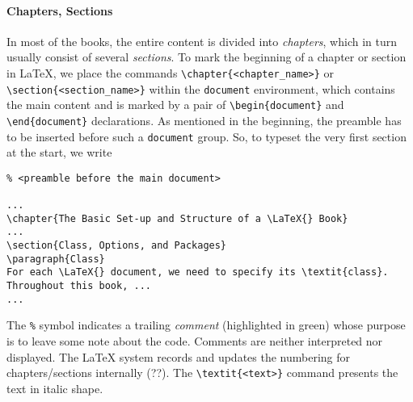 \paragraph{Chapters, Sections}
In most of the books, the entire content is divided into \textit{chapters}, which in turn usually consist of several \textit{sections}. To mark the beginning of a chapter or section in \LaTeX{}, we place the commands \texttt{\textbackslash chapter\{<chapter\_name>\}} or \texttt{\textbackslash section\{<section\_name>\}} within the \verb|document| environment, which contains the main content and is marked by a pair of \texttt{\textbackslash begin\{document\}} and \texttt{\textbackslash end\{document\}} declarations. As mentioned in the beginning, the preamble has to be inserted before such a \verb|document| group. So, to typeset the very first section at the start, we write
\begin{lstlisting}
% <preamble before the main document>

...
\chapter{The Basic Set-up and Structure of a \LaTeX{} Book}
...
\section{Class, Options, and Packages}
\paragraph{Class}
For each \LaTeX{} document, we need to specify its \textit{class}. Throughout this book, ...
...

\end{lstlisting}
The \verb|%| symbol indicates a trailing \textit{comment} (highlighted in green) whose purpose is to leave some note about the code. Comments are neither interpreted nor displayed. The \LaTeX{} system records and updates the numbering for chapters/sections internally (??). The \texttt{\textbackslash textit\{<text>\}} command presents the text in italic shape.

